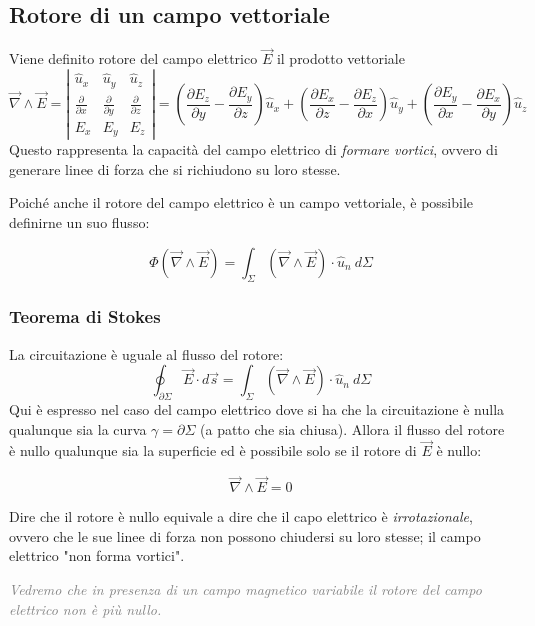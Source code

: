 \documentclass[x11names]{report}
\newcommand{\teorema}[2]{
	\begin{center}
		\fboxsep11pt
		\colorbox{myred}{\begin{minipage}{5.75in}
				\begin{redes}{#1}
					#2
				\end{redes}
		\end{minipage}}
	\end{center}
}
\begin{document}
\subsection{Rotore di un campo vettoriale}
Viene definito rotore del campo elettrico \(\vec{E}\) il prodotto vettoriale
\[
\vec{\nabla} \wedge \vec{E} = \left|\begin{array}{ccc}
	\hat{u}_x & \hat{u}_y & \hat{u}_z \\
	\frac{\partial}{\partial x} & \frac{\partial}{\partial y} & \frac{\partial}{\partial z} \\
	E_x & E_y & E_z 
\end{array}\right| = \left(\frac{\partial E_z}{\partial y}-\frac{\partial E_y}{\partial z}\right)\hat{u}_x + \left(\frac{\partial E_x}{\partial z}-\frac{\partial E_z}{\partial x}\right)\hat{u}_y + \left(\frac{\partial E_y}{\partial x}-\frac{\partial E_x}{\partial y}\right)\hat{u}_z
\]
Questo rappresenta la capacità del campo elettrico di \textit{formare vortici}, ovvero di generare linee di forza che si richiudono su loro stesse.


Poiché anche il rotore del campo elettrico è un campo vettoriale, è possibile definirne un suo flusso:

\[
\Phi(\vec{\nabla} \wedge \vec{E}) =  \int_{\Sigma}\left(\vec{\nabla} \wedge \vec{E}\right)\cdot \hat{u}_n \: d\Sigma
\]

\teorema{}{\label{stokes}
\subsubsection{Teorema di Stokes}
La circuitazione è uguale al flusso del rotore:
\[
\oint_{\partial\Sigma} \vec{E}\cdot d\vec{s} = \int_{\Sigma}\left(\vec{\nabla} \wedge \vec{E}\right)\cdot \hat{u}_n \: d\Sigma
\]
Qui è espresso nel caso del campo elettrico dove si ha che la circuitazione è nulla qualunque sia la curva \(\gamma = \partial \Sigma\) (a patto che sia chiusa). Allora il flusso del rotore è nullo qualunque sia la superficie ed è possibile solo se il rotore di \(\vec{E}\) è nullo:

\[
\vec{\nabla} \wedge \vec{E} = 0
\]

Dire che il rotore è nullo equivale a dire che il capo elettrico è \textit{irrotazionale}, ovvero che le sue linee di forza non possono chiudersi su loro stesse; il campo elettrico "non forma vortici".

\textcolor{gray}{\textit{Vedremo che in presenza di un campo magnetico variabile il rotore del campo elettrico non è più nullo.}}
}
\end{document}
